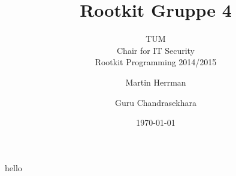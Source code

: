 \documentclass[10pt, letterpaper]{scrartcl}
\title{Rootkit Gruppe 4}
\subtitle{TUM \\Chair for IT Security\\  Rootkit Programming 2014/2015}
\author{Martin Herrman \and Guru Chandrasekhara}
\date{\today}
\begin{document}
\maketitle
\tableofcontents
\newpage

hello
\end{document}
